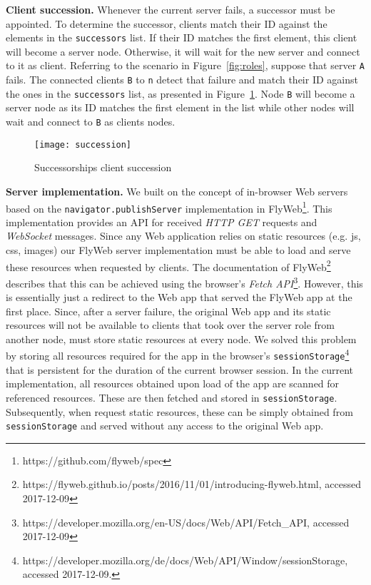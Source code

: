 \noindent\textbf{Client succession.} 
Whenever the current server fails, a successor must be appointed. 
To determine the successor, clients match their ID against the elements in the \texttt{successors} list.
If their ID matches the first element, this client will become a server node.
Otherwise, it will wait for the new server and connect to it as client.
Referring to the scenario in Figure~\ref{fig:roles}, suppose that server \texttt{A} fails. 
The connected clients \texttt{B} to \texttt{n} detect that failure and match their ID against the ones in the \texttt{successors} list, as presented in Figure~\ref{fig:succession}. Node \texttt{B} will become a server node as its ID matches the first element in the list while other nodes will wait and connect to \texttt{B} as clients nodes.

\begin{figure}[h]
    \centering
    \texttt{[image: succession]}
    \caption{Successorships client succession}
    \label{fig:succession}
\end{figure}

\noindent\textbf{Server implementation.}
We built on the concept of in-browser Web servers based on the \texttt{navigator.publishServer} implementation in FlyWeb\footnote{https://github.com/flyweb/spec}.
This implementation provides an API for received \textit{HTTP GET} requests and \textit{WebSocket} messages.
Since any Web application relies on static resources (e.g. js, css, images) our FlyWeb server implementation must be able to load and serve these resources when requested by clients.
The documentation of FlyWeb\footnote{https://flyweb.github.io/posts/2016/11/01/introducing-flyweb.html, accessed 2017-12-09} describes that this can be achieved using the browser's \textit{Fetch API}\footnote{https://developer.mozilla.org/en-US/docs/Web/API/Fetch\_API, accessed 2017-12-09}.
However, this is essentially just a redirect to the Web app that served the FlyWeb app at the first place.
Since, after a server failure, the original Web app and its static resources will not be available to clients that took over the server role from another node, \APIshort must store static resources at every node.
We solved this problem by storing all resources required for the \APIshort app in the browser's \texttt{sessionStorage}\footnote{https://developer.mozilla.org/de/docs/Web/API/Window/sessionStorage, accessed 2017-12-09.} that is persistent for the duration of the current browser session.
In the current implementation, all resources obtained upon load of the app are scanned for referenced resources.
These are then fetched and stored in \texttt{sessionStorage}.
Subsequently, when \APIshort request static resources, these can be simply obtained from \texttt{sessionStorage} and served without any access to the original Web app.



